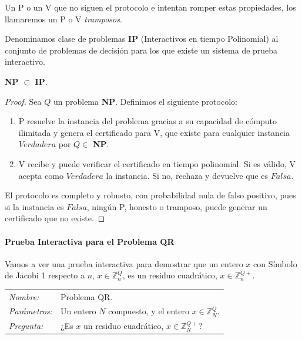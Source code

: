 Un P o un V que no siguen el protocolo e intentan romper estas propiedades, los llamaremos un P o V \textit{tramposos}.


\begin{definition}
	Denominamos clase de problemas \textbf{IP} (Interactivos en tiempo Polinomial) al conjunto de problemas de decisión para los que existe un sistema de prueba interactivo.
\end{definition}

\begin{proposition}
	\textbf{NP} $\subset$ \textbf{IP}.
\end{proposition}

\begin{proof}
	Sea $Q$ un problema \textbf{NP}. Definimos el siguiente protocolo:

	\begin{enumerate}
		\item  P resuelve la instancia del problema gracias a su capacidad de cómputo ilimitada y genera el certificado para V, que existe para cualquier instancia $Verdadera$ por $Q\in$ \textbf{NP}.
		\item  V recibe y puede verificar el certificado en tiempo polinomial. Si es válido, V acepta como $Verdadera$ la instancia. Si no, rechaza y devuelve que es $Falsa$.
	\end{enumerate}

	El protocolo es completo y robusto, con probabilidad nula de falso positivo, pues si la instancia es $Falsa$, ningún P, honesto o tramposo, puede generar un certificado que no existe.

\end{proof}


\hfil

\paragraph{Prueba Interactiva para el Problema QR}

\hfil

\hfil

Vamos a ver una prueba interactiva para demostrar que un entero $x$ con Símbolo de Jacobi 1 respecto a $n$, $x \in \mathbb{Z}^Q_n$, es un residuo cuadrático, $x \in \mathbb{Z}^{Q+}_n$.

\hfil

\begin{tabular}{|ll}
	\textit{Nombre:} & Problema QR. \\
	\textit{Parámetros:} & Un entero $N$ compuesto, y el entero $x\in \mathbb{Z}^Q_N$. \\
	\textit{Pregunta:} & ¿Es $x$ un residuo cuadrático, $x \in \mathbb{Z}^{Q+}_N$? \\
\end{tabular}
\\

